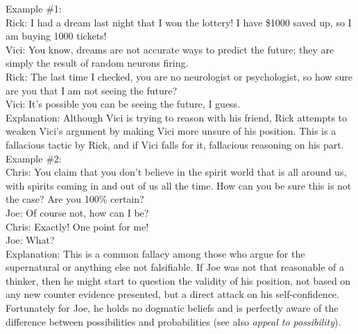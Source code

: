 \documentclass[a4paper,12pt,single,pdftex]{scrbook}
\begin{document}
    
      Example \#1:
    \\

    
      Rick: I had a dream last night that I won the lottery!  I have \$1000 saved up, so I am buying 1000 tickets!
    \\

    
      Vici: You know, dreams are not accurate ways to predict the future; they are simply the result of random neurons firing.
    \\

    
      Rick: The last time I checked, you are no neurologist or psychologist, so how sure are you that I am not seeing the future?
    \\

    
      Vici: It’s possible you can be seeing the future, I guess.
    \\

    
      Explanation: Although Vici is trying to reason with his friend, Rick attempts to weaken Vici’s argument by making Vici more unsure of his position.  This is a fallacious tactic by Rick, and if Vici falls for it, fallacious reasoning on his part.
    \\

    
      Example \#2:
    \\

    
      Chris: You claim that you don’t believe in the spirit world that is all around us, with spirits coming in and out of us all the time.  How can you be sure this is not the case?  Are you 100\% certain?
    \\

    
      Joe: Of course not, how can I be?
    \\

    
      Chris: Exactly! One point for me!
    \\

    
      Joe: What?
    \\

    
      Explanation: This is a common fallacy among those who argue for the supernatural or anything else not falsifiable.  If Joe was not that reasonable of a thinker, then he might start to question the validity of his position, not based on any new counter evidence presented, but a direct attack on his self-confidence.  Fortunately for Joe, he holds no dogmatic beliefs and is perfectly aware of the difference between possibilities and probabilities (see also {\it appeal to possibility}).
    \\
\end{document}
